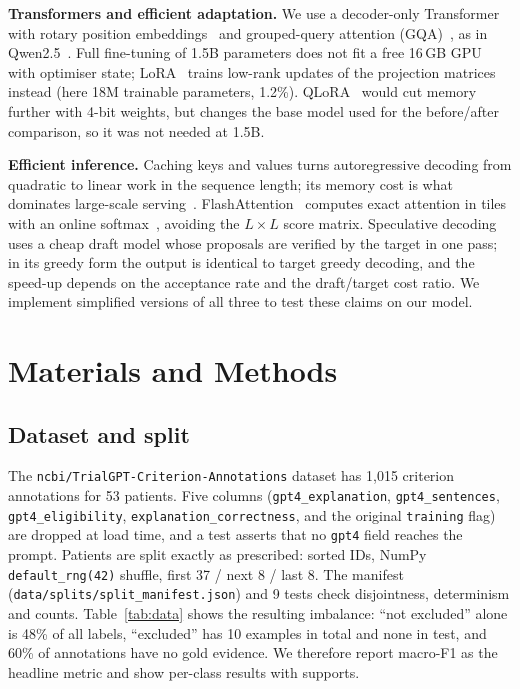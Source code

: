 \documentclass[conference]{IEEEtran}
\begin{document}
\textbf{Transformers and efficient adaptation.} We use a decoder-only Transformer~\cite{vaswani} with rotary position embeddings~\cite{rope} and grouped-query attention (GQA)~\cite{gqa}, as in Qwen2.5~\cite{qwen25}. Full fine-tuning of 1.5B parameters does not fit a free 16\,GB GPU with optimiser state; LoRA~\cite{lora} trains low-rank updates of the projection matrices instead (here 18M trainable parameters, 1.2\%). QLoRA~\cite{qlora} would cut memory further with 4-bit weights, but changes the base model used for the before/after comparison, so it was not needed at 1.5B.

\textbf{Efficient inference.} Caching keys and values turns autoregressive decoding from quadratic to linear work in the sequence length; its memory cost is what dominates large-scale serving~\cite{pope}. FlashAttention~\cite{flash} computes exact attention in tiles with an online softmax~\cite{online}, avoiding the $L\times L$ score matrix. Speculative decoding~\cite{leviathan,chen} uses a cheap draft model whose proposals are verified by the target in one pass; in its greedy form the output is identical to target greedy decoding, and the speed-up depends on the acceptance rate and the draft/target cost ratio. We implement simplified versions of all three to test these claims on our model.

\section{Materials and Methods}
\subsection{Dataset and split}
The \texttt{ncbi/TrialGPT-Criterion-Annotations} dataset has 1,015 criterion annotations for 53 patients. Five columns (\texttt{gpt4\_explanation}, \texttt{gpt4\_sentences}, \texttt{gpt4\_eligibility}, \texttt{explanation\_correctness}, and the original \texttt{training} flag) are dropped at load time, and a test asserts that no \texttt{gpt4} field reaches the prompt. Patients are split exactly as prescribed: sorted IDs, NumPy \texttt{default\_rng(42)} shuffle, first 37 / next 8 / last 8. The manifest (\texttt{data/splits/split\_manifest.json}) and 9 tests check disjointness, determinism and counts. Table~\ref{tab:data} shows the resulting imbalance: ``not excluded'' alone is 48\% of all labels, ``excluded'' has 10 examples in total and none in test, and 60\% of annotations have no gold evidence. We therefore report macro-F1 as the headline metric and show per-class results with supports.
\end{document}
